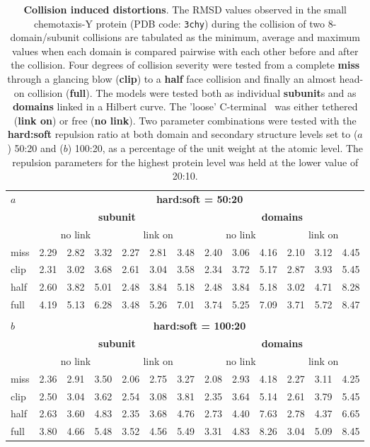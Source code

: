 \documentclass[review]{elsarticle}
\begin{document}
{{{{{\begin{table}
\centering
\begin{tabular}{l|rrr|rrr||rrr|rrr|}
$a$  & \multicolumn{12}{c}{\bf hard:soft = 50:20} \\
     & \multicolumn{6}{|c||}{\bf subunit} & \multicolumn{6}{c|}{\bf domains} \\
     & \multicolumn{3}{|c|}{no link} & \multicolumn{3}{c||}{link on}  & \multicolumn{3}{c|}{no link} & \multicolumn{3}{c|}{link on}\\
\hline
miss & 2.29 & 2.82 & 3.32 &   2.27 & 2.81 & 3.48 &      2.40 & 3.06 & 4.16 &   2.10 & 3.12 & 4.45 \\
clip & 2.31 & 3.02 & 3.68 &   2.61 & 3.04 & 3.58 &      2.34 & 3.72 & 5.17 &   2.87 & 3.93 & 5.45 \\
half & 2.60 & 3.82 & 5.01 &   2.48 & 3.84 & 5.18 &      2.48 & 3.84 & 5.18 &   3.02 & 4.71 & 8.28 \\
full & 4.19 & 5.13 & 6.28 &   3.48 & 5.26 & 7.01 &      3.74 & 5.25 & 7.09 &   3.71 & 5.72 & 8.47 \\
\hline \hline
       \multicolumn{13}{c}{} \\
$b$  & \multicolumn{12}{c}{\bf hard:soft = 100:20} \\
     & \multicolumn{6}{|c||}{\bf subunit} & \multicolumn{6}{c|}{\bf domains} \\
     & \multicolumn{3}{|c|}{no link} & \multicolumn{3}{c||}{link on}  & \multicolumn{3}{c|}{no link} & \multicolumn{3}{c|}{link on}\\
\hline
miss & 2.36 & 2.91 & 3.50 &   2.06 & 2.75 & 3.27 &      2.08 & 2.93 & 4.18 &   2.27 & 3.11 & 4.25 \\
clip & 2.50 & 3.04 & 3.62 &   2.54 & 3.08 & 3.81 &      2.35 & 3.64 & 5.14 &   2.61 & 3.79 & 5.45 \\
half & 2.63 & 3.60 & 4.83 &   2.35 & 3.68 & 4.76 &      2.73 & 4.40 & 7.63 &   2.78 & 4.37 & 6.65 \\
full & 3.80 & 4.66 & 5.48 &   3.52 & 4.56 & 5.49 &      3.31 & 4.83 & 8.26 &   3.04 & 5.09 & 8.45 \\
\hline \hline
\end{tabular}
\caption{
\label{Tab:bumps}
{\bf Collision induced distortions}.
The RMSD values observed in the small chemotaxis-Y protein (PDB code: {\tt 3chy}) during the collision
of two 8-domain/subunit collisions are tabulated as the minimum, average and maximum values when each
domain is compared pairwise with each other before and after the collision.   Four degrees of collision
severity were tested from a complete {\bf miss} through a glancing blow ({\bf clip}) to a {\bf half} face
collision and finally an almost head-on collision ({\bf full}).    The models were tested both as individual
{\bf subunit}s and as {\bf domains} linked in a Hilbert curve.   The 'loose' C-terminal \AH\ was either
tethered ({\bf link on}) or free ({\bf no link}).    Two parameter combinations were tested with the
{\bf hard:soft} repulsion ratio at both domain and secondary structure levels set to ($a$) 50:20 and ($b$) 
100:20, as a percentage of the unit weight at the atomic level.  The repulsion parameters for the 
highest protein level was held at the lower value of 20:10.
}
\end{table}

}}}}}
\end{document}
